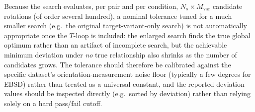 \documentclass[11pt]{article}
\begin{document}
Because the search evaluates, per pair and per condition, $N_s \times
M_{\text{var}}$ candidate rotations (of order several hundred), a
nominal tolerance tuned for a much smaller search (e.g.\ the original
target-variant-only search) is not automatically appropriate once the
$T$-loop is included: the enlarged search finds the true global optimum
rather than an artifact of incomplete search, but the achievable minimum
deviation under \emph{no} true relationship also shrinks as the number
of candidates grows. The tolerance should therefore be calibrated
against the specific dataset's orientation-measurement noise floor
(typically a few degrees for EBSD) rather than treated as a universal
constant, and the reported deviation values should be inspected directly
(e.g.\ sorted by deviation) rather than relying solely on a hard
pass/fail cutoff.
\end{document}
